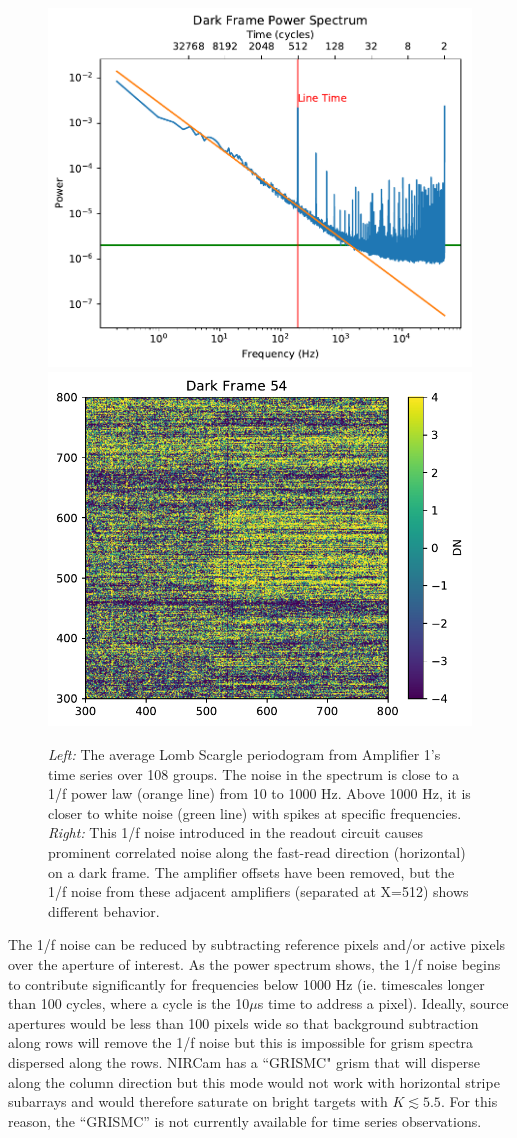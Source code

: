\documentclass{aastex62}
\begin{document}
\begin{figure}[!hbtp]
\centering
\includegraphics[width=.4\columnwidth]{avg_psd_amp_1.pdf}
\includegraphics[width=.4\columnwidth]{preamp_removed_grp_54.pdf}
\caption{{\it Left:} The average Lomb Scargle periodogram from Amplifier 1's time series over 108 groups.
The noise in the spectrum is close to a 1/f power law (orange line) from 10 to 1000 Hz.
Above 1000 Hz, it is closer to white noise (green line) with spikes at specific frequencies.
{\it Right:} This 1/f noise introduced in the readout circuit causes prominent correlated noise along the fast-read direction (horizontal) on a dark frame.
The amplifier offsets have been removed, but the 1/f noise from these adjacent amplifiers (separated at X=512) shows different behavior.
}\label{fig:pixelTSeriesPSpec}
\end{figure}

The 1/f noise can be reduced by subtracting reference pixels and/or active pixels over the aperture of interest.
As the power spectrum shows, the 1/f noise begins to contribute significantly for frequencies below 1000 Hz (ie. timescales longer than 100 cycles, where a cycle is the 10$\mu$s time to address a pixel).
Ideally, source apertures would be less than 100 pixels wide so that background subtraction along rows will remove the 1/f noise but this is impossible for grism spectra dispersed along the rows.
NIRCam has a ``GRISMC" grism that will disperse along the column direction but this mode would not work with horizontal stripe subarrays and would therefore saturate on bright targets with $K \lesssim 5.5$.
For this reason, the ``GRISMC'' is not currently available for time series observations.
\end{document}
